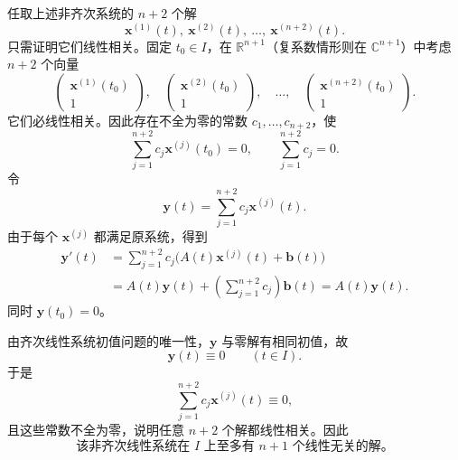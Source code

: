 \documentclass[11pt,a4paper]{ctexart}
\newcommand{\xx}{\boldsymbol{x}}
\newcommand{\bb}{\boldsymbol{b}}
\begin{document}
任取上述非齐次系统的 $n+2$ 个解
\[
\xx^{(1)}(t),\ \xx^{(2)}(t),\ \ldots,\ \xx^{(n+2)}(t).
\]
只需证明它们线性相关。固定 $t_0\in I$，在 $\mathbb R^{n+1}$（复系数情形则在 $\mathbb C^{n+1}$）中考虑 $n+2$ 个向量
\[
\begin{pmatrix}\xx^{(1)}(t_0)\\1\end{pmatrix},\quad
\begin{pmatrix}\xx^{(2)}(t_0)\\1\end{pmatrix},\quad\ldots,\quad
\begin{pmatrix}\xx^{(n+2)}(t_0)\\1\end{pmatrix}.
\]
它们必线性相关。因此存在不全为零的常数 $c_1,\ldots,c_{n+2}$，使
\[
\sum_{j=1}^{n+2}c_j\xx^{(j)}(t_0)=0,
\qquad
\sum_{j=1}^{n+2}c_j=0.
\]
令
\[
\boldsymbol{y}(t)=\sum_{j=1}^{n+2}c_j\xx^{(j)}(t).
\]
由于每个 $\xx^{(j)}$ 都满足原系统，得到
\begin{align*}
\boldsymbol{y}'(t)
&=\sum_{j=1}^{n+2}c_j\bigl(A(t)\xx^{(j)}(t)+\bb(t)\bigr)\\
&=A(t)\boldsymbol{y}(t)+\left(\sum_{j=1}^{n+2}c_j\right)\bb(t)
=A(t)\boldsymbol{y}(t).
\end{align*}
同时 $\boldsymbol{y}(t_0)=0$。

由齐次线性系统初值问题的唯一性，$\boldsymbol{y}$ 与零解有相同初值，故
\[
\boldsymbol{y}(t)\equiv0\qquad(t\in I).
\]
于是
\[
\sum_{j=1}^{n+2}c_j\xx^{(j)}(t)\equiv0,
\]
且这些常数不全为零，说明任意 $n+2$ 个解都线性相关。因此
\[
\boxed{\text{该非齐次线性系统在 }I\text{ 上至多有 }n+1\text{ 个线性无关的解。}}
\]
\end{document}
